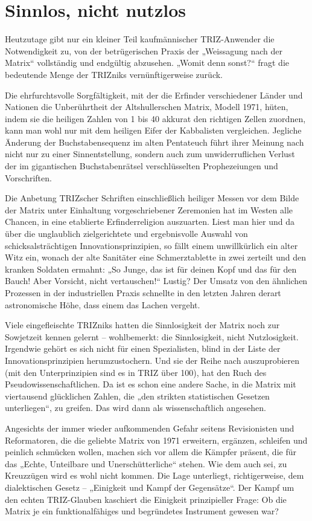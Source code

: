 \documentclass[11pt,a4paper]{article}
\begin{document}
\section*{Sinnlos, nicht nutzlos}
Heutzutage gibt nur ein kleiner Teil kaufmännischer TRIZ-Anwender die
Notwendigkeit zu, von der betrügerischen Praxis der „Weissagung nach der
Matrix“ vollständig und endgültig abzusehen. „Womit denn sonst?“ fragt die
bedeutende Menge der TRIZniks vernünftigerweise zurück.

Die ehrfurchtsvolle Sorgfältigkeit, mit der die Erfinder verschiedener Länder
und Nationen die Unberührtheit der Altshullerschen Matrix, Modell 1971, hüten,
indem sie die heiligen Zahlen von 1 bis 40 akkurat den richtigen Zellen
zuordnen, kann man wohl nur mit dem heiligen Eifer der Kabbalisten
vergleichen. Jegliche Änderung der Buchstabensequenz im alten Pentateuch führt
ihrer Meinung nach nicht nur zu einer Sinnentstellung, sondern auch zum
unwiderruflichen Verlust der im gigantischen Buchstabenrätsel verschlüsselten
Prophezeiungen und Vorschriften.

Die Anbetung TRIZscher Schriften einschließlich heiliger Messen vor dem Bilde
der Matrix unter Einhaltung vorgeschriebener Zeremonien hat im Westen alle
Chancen, in eine etablierte Erfinderreligion auszuarten. Liest man hier und da
über die unglaublich zielgerichtete und ergebnisvolle Auswahl von
schicksalsträchtigen Innovationsprinzipien, so fällt einem unwillkürlich ein
alter Witz ein, wonach der alte Sanitäter eine Schmerztablette in zwei
zerteilt und den kranken Soldaten ermahnt: „So Junge, das ist für deinen Kopf
und das für den Bauch! Aber Vorsicht, nicht vertauschen!“ Lustig? Der Umsatz
von den ähnlichen Prozessen in der industriellen Praxis schnellte in den
letzten Jahren derart astronomische Höhe, dass einem das Lachen vergeht.

Viele eingefleischte TRIZniks hatten die Sinnlosigkeit der Matrix noch zur
Sowjetzeit kennen gelernt – wohlbemerkt: die Sinnlosigkeit, nicht
Nutzlosigkeit. Irgendwie gehört es sich nicht für einen Spezialisten, blind in
der Liste der Innovationsprinzipien herumzustochern. Und sie der Reihe nach
auszuprobieren (mit den Unterprinzipien sind es in TRIZ über 100), hat den
Ruch des Pseudowissenschaftlichen. Da ist es schon eine andere Sache, in die
Matrix mit viertausend glücklichen Zahlen, die „den strikten statistischen
Gesetzen unterliegen“, zu greifen. Das wird dann als wissenschaftlich
angesehen.

Angesichts der immer wieder aufkommenden Gefahr seitens Revisionisten und
Reformatoren, die die geliebte Matrix von 1971 erweitern, ergänzen, schleifen
und peinlich schmücken wollen, machen sich vor allem die Kämpfer präsent, die
für das „Echte, Unteilbare und Unerschütterliche“ stehen. Wie dem auch sei, zu
Kreuzzügen wird es wohl nicht kommen. Die Lage unterliegt, richtigerweise, dem
dialektischen Gesetz – „Einigkeit und Kampf der Gegensätze“. Der Kampf um den
echten TRIZ-Glauben kaschiert die Einigkeit prinzipieller Frage: Ob die Matrix
je ein funktionalfähiges und begründetes Instrument gewesen war?
\end{document}
